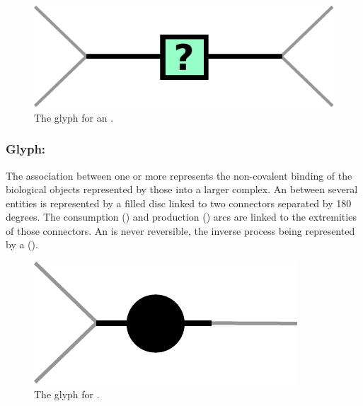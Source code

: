 \begin{figure}[H]
  \centering
  \includegraphics[scale = 0.5]{le_images/uncertain}
  \caption{The \PD glyph for an .}
  \label{fig:uncertain}
\end{figure}


\subsubsection{Glyph: }\label{sec:association}

The association between one or more  represents the non-covalent binding of the biological objects represented by those  into a larger complex. An  between several entities is represented by a filled disc linked to two connectors separated by 180 degrees. The consumption () and production () arcs are linked to the extremities of those connectors. An  is never reversible, the inverse process being represented by a  ().

\begin{figure}[H]
  \centering
  \includegraphics[scale = 0.5]{le_images/association}
  \caption{The \PD glyph for .}
  \label{fig:association}
\end{figure}

